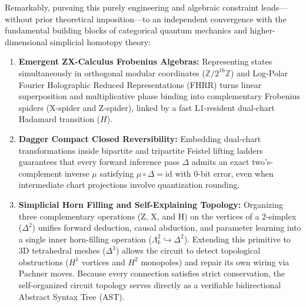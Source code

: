 \documentclass[11pt, a4paper]{article}
\begin{document}
Remarkably, pursuing this purely engineering and algebraic constraint leads---without prior theoretical imposition---to an independent convergence with the fundamental building blocks of categorical quantum mechanics and higher-dimensional simplicial homotopy theory:
\begin{enumerate}
    \item \textbf{Emergent ZX-Calculus Frobenius Algebras:} Representing states simultaneously in orthogonal modular coordinates ($\mathbb{Z}/2^{16}\mathbb{Z}$) and Log-Polar Fourier Holographic Reduced Representations (FHRR) turns linear superposition and multiplicative phase binding into complementary Frobenius spiders (X-spider and Z-spider), linked by a fast L1-resident dual-chart Hadamard transition ($H$).
    \item \textbf{Dagger Compact Closed Reversibility:} Embedding dual-chart transformations inside bipartite and tripartite Feistel lifting ladders guarantees that every forward inference pass $\Delta$ admits an exact two's-complement inverse $\mu$ satisfying $\mu \circ \Delta = \mathrm{id}$ with 0-bit error, even when intermediate chart projections involve quantization rounding.
    \item \textbf{Simplicial Horn Filling and Self-Explaining Topology:} Organizing three complementary operations (Z, X, and H) on the vertices of a 2-simplex ($\Delta^2$) unifies forward deduction, causal abduction, and parameter learning into a single inner horn-filling operation ($\Lambda^2_k \hookrightarrow \Delta^2$). Extending this primitive to 3D tetrahedral meshes ($\Delta^3$) allows the circuit to detect topological obstructions ($H^1$ vortices and $H^2$ monopoles) and repair its own wiring via Pachner moves. Because every connection satisfies strict conservation, the self-organized circuit topology serves directly as a verifiable bidirectional Abstract Syntax Tree (AST).
\end{enumerate}
\end{document}
